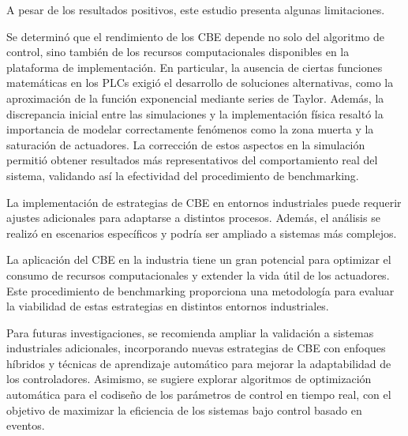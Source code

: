 \documentclass[conference]{IEEEtran}
\begin{document}
A pesar de los resultados positivos, este estudio presenta algunas limitaciones.

Se determinó que el rendimiento de los CBE depende no solo del algoritmo de control, sino también de los recursos computacionales disponibles en la plataforma de implementación. En particular, la ausencia de ciertas funciones matemáticas en los PLCs exigió el desarrollo de soluciones alternativas, como la aproximación de la función exponencial mediante series de Taylor. Además, la discrepancia inicial entre las simulaciones y la implementación física resaltó la importancia de modelar correctamente fenómenos como la zona muerta y la saturación de actuadores. La corrección de estos aspectos en la simulación permitió obtener resultados más representativos del comportamiento real del sistema, validando así la efectividad del procedimiento de benchmarking.

La implementaci\'on de estrategias de CBE en entornos industriales puede requerir ajustes adicionales para adaptarse a distintos procesos. Adem\'as, el an\'alisis se realiz\'o en escenarios espec\'ificos y podr\'ia ser ampliado a sistemas m\'as complejos.

La aplicaci\'on del CBE en la industria tiene un gran potencial para optimizar el consumo de recursos computacionales y extender la vida \'util de los actuadores. Este procedimiento de benchmarking proporciona una metodolog\'ia para evaluar la viabilidad de estas estrategias en distintos entornos industriales.

Para futuras investigaciones, se recomienda ampliar la validación a sistemas industriales adicionales, incorporando nuevas estrategias de CBE con enfoques híbridos y técnicas de aprendizaje automático para mejorar la adaptabilidad de los controladores. Asimismo, se sugiere explorar algoritmos de optimización automática para el codiseño de los parámetros de control en tiempo real, con el objetivo de maximizar la eficiencia de los sistemas bajo control basado en eventos.
\end{document}
